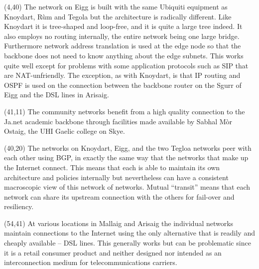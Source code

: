 \documentclass[noborder,onecolumn]{netmap}
\begin{document}
\begin{textblock}{18}(4,40)
  \linespread{1.0}
  \scriptsize
  The network on Eigg is built with the same Ubiquiti equipment as
  Knoydart, R\`um and Tegola but the architecture is radically
  different. Like Knoydart it is tree-shaped and loop-free, and it is
  quite a large tree indeed. It also employs no routing internally,
  the entire network being one large bridge. Furthermore network
  address translation is used at the edge node so that the backbone
  does not need to know anything about the edge subnets. This works
  quite well except for problems with some application protocols 
  such as SIP that are NAT-unfriendly. The exception, as with
  Knoydart, is that IP routing and OSPF is used on the connection
  between the backbone router on the Sgurr of Eigg and the DSL lines
  in Arisaig.  
\end{textblock}
\begin{textblock}{10}(41,11)
  \linespread{1.0}
  \scriptsize
  The community networks benefit from a high quality connection to the
  Ja.net academic backbone through facilities made available by Sabhal
  Mòr Ostaig, the UHI Gaelic college on Skye.
\end{textblock}
\begin{textblock}{10}(40,20)
  \linespread{1.0}
  \scriptsize
  The networks on Knoydart, Eigg, and the two
  Tegloa networks peer with each other using BGP, in exactly the same
  way that the networks that make up the Internet connect. This means
  that each is able to maintain its own architecture and policies
  internally but nevertheless can have a consistent macroscopic view
  of this network of networks. Mutual ``transit'' means that each
  network can share its upstream connection with the others for
  fail-over and resiliency.
\end{textblock}
\begin{textblock}{12}(54,41)
  \linespread{1.0}
  \scriptsize
  At various locations in Mallaig and Arisaig the individual networks
  maintain connections to the Internet using the only alternative that
  is readily and cheaply available -- DSL lines. This generally works
  but can be problematic since it is a retail consumer product and
  neither designed nor intended as an interconnection medium for
  telecommunications carriers.
\end{textblock}
\end{document}
